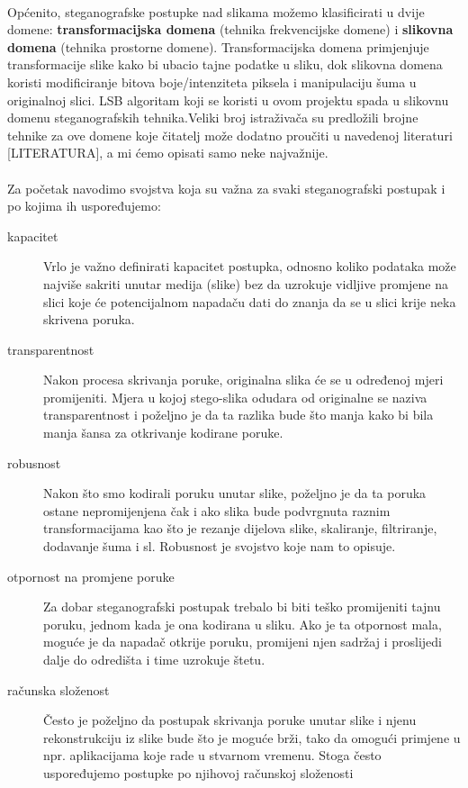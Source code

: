 \documentclass[times, utf8, seminar]{fer}
\begin{document}
\paragraph{}
Općenito, steganografske postupke nad slikama možemo klasificirati u dvije domene:
\textbf{transformacijska domena} (tehnika frekvencijske domene) i \textbf{slikovna domena} (tehnika prostorne domene). Transformacijska domena primjenjuje transformacije slike kako bi ubacio tajne podatke u sliku, dok slikovna domena koristi modificiranje bitova boje/intenziteta piksela i manipulaciju šuma u originalnoj slici. LSB algoritam koji se koristi u ovom projektu spada u slikovnu domenu steganografskih tehnika.Veliki broj istraživača su predložili brojne tehnike za ove domene koje čitatelj može dodatno proučiti u navedenoj literaturi [LITERATURA], a mi ćemo opisati samo neke najvažnije.
\paragraph{}
Za početak navodimo svojstva koja su važna za svaki steganografski postupak i po kojima ih uspoređujemo:
\begin{description}

\item[kapacitet] Vrlo je važno definirati kapacitet postupka, odnosno koliko podataka može najviše sakriti unutar medija (slike) bez da uzrokuje vidljive promjene na slici koje će potencijalnom napadaču dati do znanja da se u slici krije neka skrivena poruka.
\item[transparentnost] Nakon procesa skrivanja poruke, originalna slika će se u određenoj mjeri promijeniti. Mjera u kojoj stego-slika odudara od originalne se naziva transparentnost i poželjno je da ta razlika bude što manja kako bi bila manja šansa za otkrivanje kodirane poruke.
\item[robusnost]  Nakon što smo kodirali poruku unutar slike, poželjno je da ta poruka ostane nepromijenjena čak i ako slika bude podvrgnuta raznim transformacijama kao što je rezanje dijelova slike, skaliranje, filtriranje, dodavanje šuma i sl. Robusnost je svojstvo koje nam to opisuje.
\item[otpornost na promjene poruke] Za dobar steganografski postupak trebalo bi biti teško promijeniti tajnu poruku, jednom kada je ona kodirana u sliku. Ako je ta otpornost mala, moguće je da napadač otkrije poruku, promijeni njen sadržaj i proslijedi dalje do odredišta i time uzrokuje štetu.
\item[računska složenost] Često je poželjno da postupak skrivanja poruke unutar slike i njenu rekonstrukciju iz slike bude što je moguće brži, tako da omogući primjene u npr. aplikacijama koje rade u stvarnom vremenu. Stoga često uspoređujemo postupke po njihovoj računskoj složenosti
\end{description}
\end{document}
